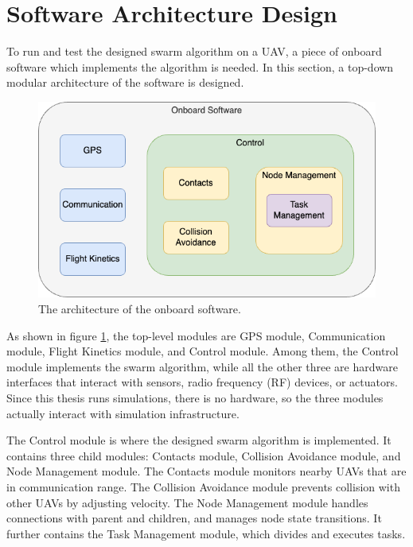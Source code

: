 \section{Software Architecture Design}
\label{sec:sft_arch}

To run and test the designed swarm algorithm on a UAV,
a piece of onboard software which implements the algorithm is needed.
In this section, a top-down modular architecture of the software is designed.

\begin{figure}[htbp]
  \centering
  \includegraphics[width=0.8\linewidth]{rsc/software_architecture.png}
  \caption
  {The architecture of the onboard software.}
  \label{fig:software_arch}
\end{figure}

As shown in figure \ref{fig:software_arch},
the top-level modules are GPS module, Communication module,
Flight Kinetics module, and Control module.
Among them, the Control module implements the swarm algorithm,
while all the other three are hardware interfaces
that interact with sensors, radio frequency (RF) devices, or actuators.
Since this thesis runs simulations, there is no hardware,
so the three modules actually interact with simulation infrastructure.

The Control module is where the designed swarm algorithm is implemented.
It contains three child modules:
Contacts module, Collision Avoidance module, and Node Management module.
The Contacts module monitors nearby UAVs that are in communication range.
The Collision Avoidance module prevents collision with other UAVs by adjusting velocity.
The Node Management module handles connections with parent and children,
and manages node state transitions.
It further contains the Task Management module, which divides and executes tasks.


